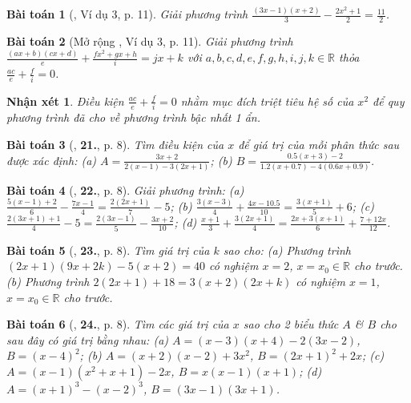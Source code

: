 \documentclass{article}
\numberwithin{equation}{section}
\newtheorem{baitoan}{Bài toán}
\newtheorem{nhanxet}{Nhận xét}[section]
\begin{document}
\begin{baitoan}[\cite{SGK_Toan_8_tap_2}, Ví dụ 3, p. 11]
	Giải phương trình $\frac{(3x - 1)(x + 2)}{3} - \frac{2x^2 + 1}{2} = \frac{11}{2}$.
\end{baitoan}

\begin{baitoan}[Mở rộng \cite{SGK_Toan_8_tap_2}, Ví dụ 3, p. 11]
	Giải phương trình $\frac{(ax + b)(cx + d)}{e} + \frac{fx^2 + gx + h}{i} = jx + k$ với $a,b,c,d,e,f,g,h,i,j,k\in\mathbb{R}$ thỏa $\frac{ac}{e} + \frac{f}{i} = 0$.
\end{baitoan}

\begin{nhanxet}
	Điều kiện $\frac{ac}{e} + \frac{f}{i} = 0$ nhằm mục đích triệt tiêu hệ số của $x^2$ để quy phương trình đã cho về phương trình bậc nhất 1 ẩn.
\end{nhanxet}

\begin{baitoan}[\cite{SBT_Toan_8_tap_2}, \textbf{21.}, p. 8]
	Tìm điều kiện của $x$ để giá trị của mỗi phân thức sau được xác định: (a) $A = \frac{3x + 2}{2(x - 1) - 3(2x + 1)}$; (b) $B = \frac{0.5(x + 3) - 2}{1.2(x + 0.7) - 4(0.6x + 0.9)}$.
\end{baitoan}

\begin{baitoan}[\cite{SBT_Toan_8_tap_2}, \textbf{22.}, p. 8]
	Giải phương trình: (a) $\frac{5(x - 1) + 2}{6} - \frac{7x - 1}{4} = \frac{2(2x + 1)}{7} - 5$; (b) $\frac{3(x - 3)}{4} + \frac{4x - 10.5}{10} = \frac{3(x + 1)}{5} + 6$; (c) $\frac{2(3x + 1) + 1}{4} - 5 = \frac{2(3x - 1)}{5} - \frac{3x + 2}{10}$; (d) $\frac{x + 1}{3} + \frac{3(2x + 1)}{4} = \frac{2x + 3(x + 1)}{6} + \frac{7 + 12x}{12}$.
\end{baitoan}

\begin{baitoan}[\cite{SBT_Toan_8_tap_2}, \textbf{23.}, p. 8]
	Tìm giá trị của $k$ sao cho: (a) Phương trình $(2x + 1)(9x + 2k) - 5(x + 2) = 40$ có nghiệm $x = 2$, $x = x_0\in\mathbb{R}$ cho trước. (b) Phương trình $2(2x + 1) + 18 = 3(x + 2)(2x + k)$ có nghiệm $x = 1$, $x = x_0\in\mathbb{R}$ cho trước.
\end{baitoan}

\begin{baitoan}[\cite{SBT_Toan_8_tap_2}, \textbf{24.}, p. 8]
	Tìm các giá trị của $x$ sao cho 2 biểu thức $A$ \& $B$ cho sau đây có giá trị bằng nhau: (a) $A = (x - 3)(x + 4) - 2(3x - 2)$, $B = (x - 4)^2$; (b) $A = (x + 2)(x - 2) + 3x^2$, $B = (2x + 1)^2 + 2x$; (c) $A = (x - 1)(x^2 + x + 1) - 2x$, $B = x(x - 1)(x + 1)$; (d) $A = (x + 1)^3 - (x - 2)^3$, $B = (3x - 1)(3x + 1)$.
\end{baitoan}
\end{document}
